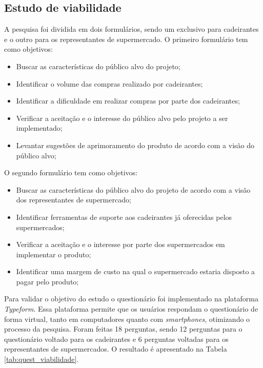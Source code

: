 \begin{apendicesenv}

\partapendices



\chapter{Estudo de viabilidade} \label{appendix:estudo_viabilidade}

\par A pesquisa foi dividida em dois formulários, sendo um exclusivo para cadeirantes e o outro para os representantes de supermercado. O primeiro formulário tem como objetivos:

\begin{itemize}  
\item Buscar as características do público alvo do projeto;
\item Identificar o volume das compras realizado por cadeirantes;
\item Identificar a dificuldade em realizar compras por parte dos cadeirantes;
\item Verificar a aceitação e o interesse do público alvo pelo projeto a ser implementado;
\item Levantar sugestões de aprimoramento do produto de acordo com a visão do público alvo;
\end{itemize}

\par O segundo formulário tem como objetivos:

\begin{itemize}  
\item Buscar as características do público alvo do projeto de acordo com a visão dos representantes de supermercado;
\item Identificar ferramentas de suporte aos cadeirantes já oferecidas pelos supermercados;
\item Verificar a aceitação e o interesse por parte dos supermercados em implementar o produto;
\item Identificar uma margem de custo na qual o supermercado estaria disposto a pagar pelo produto;
\end{itemize}

\par Para validar o objetivo do estudo o questionário foi implementado na plataforma \textit{Typeform}. Essa plataforma permite que os usuários respondam o questionário de forma virtual, tanto em computadores quanto com \textit{smartphones}, otimizando o processo da pesquisa. Foram feitas 18 perguntas, sendo 12 perguntas para o questionário voltado para os cadeirantes e 6 perguntas voltadas para os representantes  de supermercados. O resultado é apresentado na Tabela \ref{tab:quest_viabilidade}.


\end{apendicesenv}

